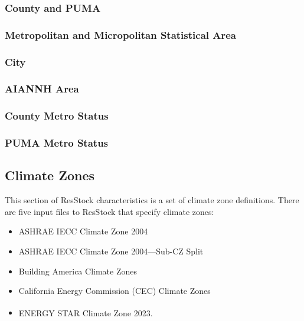 \subsubsection{County and PUMA}


\subsubsection{Metropolitan and Micropolitan Statistical Area}


\subsubsection{City}


\subsubsection{AIANNH Area}


\subsubsection{County Metro Status}


\subsubsection{PUMA Metro Status}


\subsection{Climate Zones}
This section of ResStock characteristics is a set of climate zone definitions. There are five input files to ResStock that specify climate zones:
\begin{itemize}
    \item ASHRAE IECC Climate Zone 2004
    \item ASHRAE IECC Climate Zone 2004---Sub-CZ Split
    \item Building America Climate Zones
    \item California Energy Commission (CEC) Climate Zones
    \item ENERGY STAR\textsuperscript{\textregistered} Climate Zone 2023.
\end{itemize}


